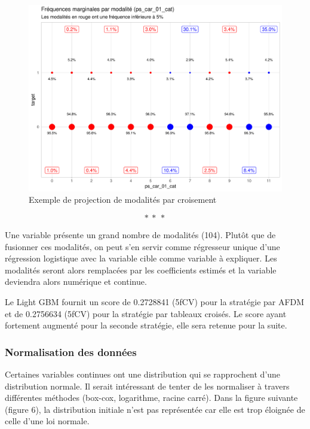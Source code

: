 \documentclass[french]{article}
\begin{document}
\begin{multicols}{2}
\begin{figure}[H] \centering
  \includegraphics[width = \columnwidth]{img/ex_tabc}
  \caption{Exemple de projection de modalités par croisement}
\end{figure}

\[ * \ * \ * \]

Une variable présente un grand nombre de modalités (104). Plutôt que de fusionner ces modalités, on peut s'en servir comme régresseur unique d'une régression logistique avec la variable cible comme variable à expliquer. Les modalités seront alors remplacées par les coefficients estimés et la variable deviendra alors numérique et continue.

Le Light GBM fournit un score de 0.2728841 (5fCV) pour la stratégie par AFDM et de 0.2756634 (5fCV) pour la stratégie par tableaux croisés. Le score ayant fortement augmenté pour la seconde stratégie, elle sera retenue pour la suite.

\subsubsection{Normalisation des données}

Certaines variables continues ont une distribution qui se rapprochent d'une distribution normale. Il serait intéressant de tenter de les normaliser à travers différentes méthodes (box-cox, logarithme, racine carré). Dans la figure suivante (figure 6), la distribution initiale n'est pas représentée car elle est trop éloignée de celle d'une loi normale.


\end{multicols}
\end{document}
